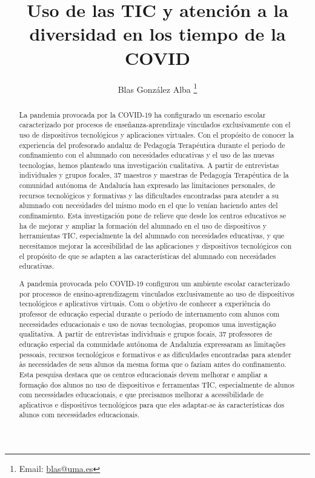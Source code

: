 \documentclass{textolivre}
\title{Uso de las TIC y atención a la diversidad en los tiempo de  la COVID}
\author[1]{Blas González Alba \orcid{0000-0002-4769-6522} \thanks{Email: \url{blas@uma.es}}}
\affil[1]{Universidad de Málaga, Facultad de
Ciencias de la Educación, Departamento de didáctica y organización
escolar. Málaga, Andalucía y España.}
\begin{document}
\maketitle

\begin{polyabstract}
\begin{abstract}
La pandemia provocada por la COVID-19 ha configurado un escenario escolar caracterizado por procesos de enseñanza-aprendizaje vinculados exclusivamente con el uso de dispositivos tecnológicos y aplicaciones virtuales. Con el propósito de conocer la experiencia del profesorado andaluz de Pedagogía Terapéutica durante el periodo de confinamiento con el alumnado con necesidades educativas y el uso de las nuevas tecnologías, hemos planteado una investigación cualitativa. A partir de entrevistas individuales y grupos focales, 37 maestros y maestras de Pedagogía Terapéutica de la comunidad autónoma de Andalucía han expresado las limitaciones personales, de recursos tecnológicos y formativas y las dificultades encontradas para atender a su alumnado con necesidades del mismo modo en el que lo venían haciendo antes del confinamiento. Esta investigación pone de relieve que desde los centros educativos se ha de mejorar y ampliar la formación del alumnado en el uso de dispositivos y herramientas TIC, especialmente la del alumnado con necesidades educativas, y que necesitamos mejorar la accesibilidad de las aplicaciones y dispositivos tecnológicos con el propósito de que se adapten a las características del alumnado con necesidades educativas. 

\end{abstract}

\begin{portuguese}
\begin{abstract}
A pandemia provocada pelo COVID-19 configurou um ambiente escolar caracterizado por processos de ensino-aprendizagem vinculados exclusivamente ao uso de dispositivos tecnológicos e aplicativos virtuais. Com o objetivo de conhecer a experiência do professor de educação especial durante o período de internamento com alunos com necessidades educacionais e uso de novas tecnologias, propomos uma investigação qualitativa. A partir de entrevistas individuais e grupos focais, 37 professores de educação especial da comunidade autônoma de Andaluzia expressaram as limitações pessoais, recursos tecnológicos e formativos e as dificuldades encontradas para atender às necessidades de seus alunos da mesma forma que o faziam antes do confinamento. Esta pesquisa destaca que os centros educacionais devem melhorar e ampliar a formação dos alunos no uso de dispositivos e ferramentas TIC, especialmente de alunos com necessidades educacionais, e que precisamos melhorar a acessibilidade de aplicativos e dispositivos tecnológicos para que eles adaptar-se às características dos alunos com necessidades educacionais.


\end{abstract}
\end{portuguese}
\end{polyabstract}
\end{document}
